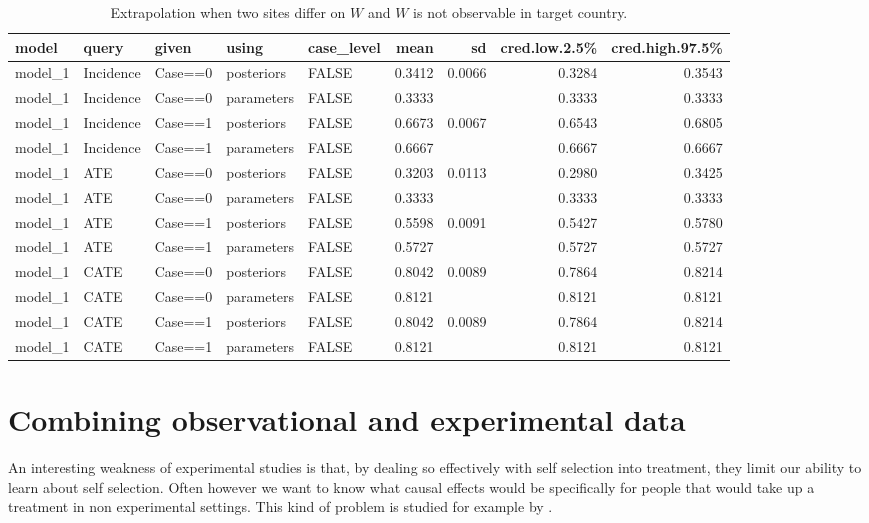 \documentclass[
  12pt,
]{book}
\begin{document}
\begin{table}

\caption{\label{tab:unnamed-chunk-112}Extrapolation when two sites differ on $W$ and $W$ is not observable in target country.}
\centering
\begin{tabular}[t]{l|l|l|l|l|r|r|r|r}
\hline
model & query & given & using & case\_level & mean & sd & cred.low.2.5\% & cred.high.97.5\%\\
\hline
model\_1 & Incidence & Case==0 & posteriors & FALSE & 0.3412 & 0.0066 & 0.3284 & 0.3543\\
\hline
model\_1 & Incidence & Case==0 & parameters & FALSE & 0.3333 &  & 0.3333 & 0.3333\\
\hline
model\_1 & Incidence & Case==1 & posteriors & FALSE & 0.6673 & 0.0067 & 0.6543 & 0.6805\\
\hline
model\_1 & Incidence & Case==1 & parameters & FALSE & 0.6667 &  & 0.6667 & 0.6667\\
\hline
model\_1 & ATE & Case==0 & posteriors & FALSE & 0.3203 & 0.0113 & 0.2980 & 0.3425\\
\hline
model\_1 & ATE & Case==0 & parameters & FALSE & 0.3333 &  & 0.3333 & 0.3333\\
\hline
model\_1 & ATE & Case==1 & posteriors & FALSE & 0.5598 & 0.0091 & 0.5427 & 0.5780\\
\hline
model\_1 & ATE & Case==1 & parameters & FALSE & 0.5727 &  & 0.5727 & 0.5727\\
\hline
model\_1 & CATE & Case==0 & posteriors & FALSE & 0.8042 & 0.0089 & 0.7864 & 0.8214\\
\hline
model\_1 & CATE & Case==0 & parameters & FALSE & 0.8121 &  & 0.8121 & 0.8121\\
\hline
model\_1 & CATE & Case==1 & posteriors & FALSE & 0.8042 & 0.0089 & 0.7864 & 0.8214\\
\hline
model\_1 & CATE & Case==1 & parameters & FALSE & 0.8121 &  & 0.8121 & 0.8121\\
\hline
\end{tabular}
\end{table}

\hypertarget{combining-observational-and-experimental-data}{%
\section{Combining observational and experimental data}\label{combining-observational-and-experimental-data}}

An interesting weakness of experimental studies is that, by dealing so effectively with self selection into treatment, they limit our ability to learn about self selection. Often however we want to know what causal effects would be specifically for people that would take up a treatment in non experimental settings. This kind of problem is studied for example by \citet{knox2019design}.
\end{document}
